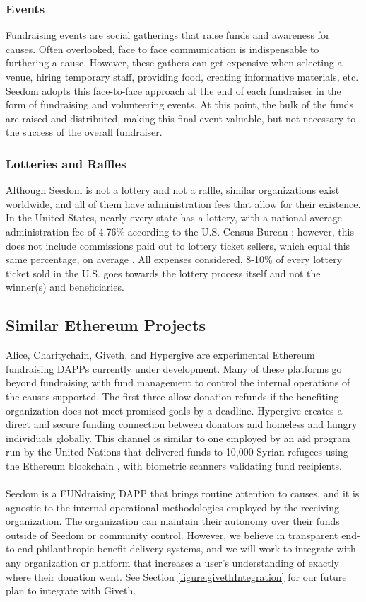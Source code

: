 \documentclass[11pt]{article}
\begin{document}
\subsubsection{Events}

Fundraising events are social gatherings that raise funds and awareness for causes. Often overlooked, face to face communication is indispensable to furthering a cause. However, these gathers can get expensive when selecting a venue, hiring temporary staff, providing food, creating informative materials, etc. Seedom adopts this face-to-face approach at the end of each fundraiser in the form of fundraising and volunteering events. At this point, the bulk of the funds are raised and distributed, making this final event valuable, but not necessary to the success of the overall fundraiser.

\subsubsection{Lotteries and Raffles}

Although Seedom is not a lottery and not a raffle, similar organizations exist worldwide, and all of them have administration fees that allow for their existence. In the United States, nearly every state has a lottery, with a national average administration fee of 4.76\% according to the U.S. Census Bureau \cite{3}; however, this does not include commissions paid out to lottery ticket sellers, which equal this same percentage, on average \cite{4}. All expenses considered, 8-10\% of every lottery ticket sold in the U.S. goes towards the lottery process itself and not the winner(s) and beneficiaries.

\subsection{Similar Ethereum Projects}

Alice, Charitychain, Giveth, and Hypergive are experimental Ethereum fundraising DAPPs currently under development. Many of these platforms go beyond fundraising with fund management to control the internal operations of the causes supported. The first three allow donation refunds if the benefiting organization does not meet promised goals by a deadline. Hypergive creates a direct and secure funding connection between donators and homeless and hungry individuals globally. This channel is similar to one employed by an aid program run by the United Nations that delivered funds to 10,000 Syrian refugees using the Ethereum blockchain \cite{6}, with biometric scanners validating fund recipients.\\\\
Seedom is a FUNdraising DAPP that brings routine attention to causes, and it is agnostic to the internal operational methodologies employed by the receiving organization. The organization can maintain their autonomy over their funds outside of Seedom or community control. However, we believe in transparent end-to-end philanthropic benefit delivery systems, and we will work to integrate with any organization or platform that increases a user's understanding of exactly where their donation went. See Section \ref{figure:givethIntegration} for our future plan to integrate with Giveth.
\end{document}
